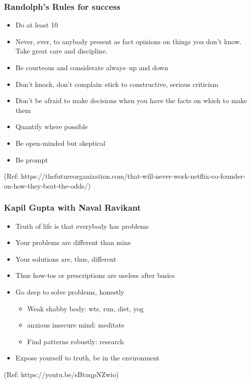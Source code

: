 \begin{frame}[fragile]\frametitle{ Randolph's Rules for success }

	\begin{itemize}
	\item Do at least 10%
	\item Never, ever, to anybody present as fact opinions on things you don’t know. Take great care and discipline.
	\item Be courteous and considerate always–up and down
	\item Don’t knock, don’t complain–stick to constructive, serious criticism
	\item Don’t be afraid to make decisions when you have the facts on which to make them
	\item Quantify where possible
	\item Be open-minded but skeptical
	\item Be prompt
	\end{itemize}

{\tiny (Ref: https://thefutureorganization.com/that-will-never-work-netflix-co-founder-on-how-they-beat-the-odds/)}

\end{frame}


\begin{frame}[fragile]\frametitle{ Kapil Gupta with Naval Ravikant}

	\begin{itemize}
	\item Truth of life is that everybody has problems 
	\item Your problems are different than mine
	\item Your solutions are, thus, different 
	\item Thus how-tos or prescriptions are useless after basics
	\item Go deep to solve problems, honestly 
	\begin{itemize}
		\item Weak shabby body: wts, run, diet, yog
		\item anxious insecure mind: meditate
		\item Find patterns robustly: research
	\end{itemize}
	\item Expose yourself to truth, be in the environment 
	\end{itemize}

{\tiny (Ref: https://youtu.be/sBtuqpNZwio)}

\end{frame}

